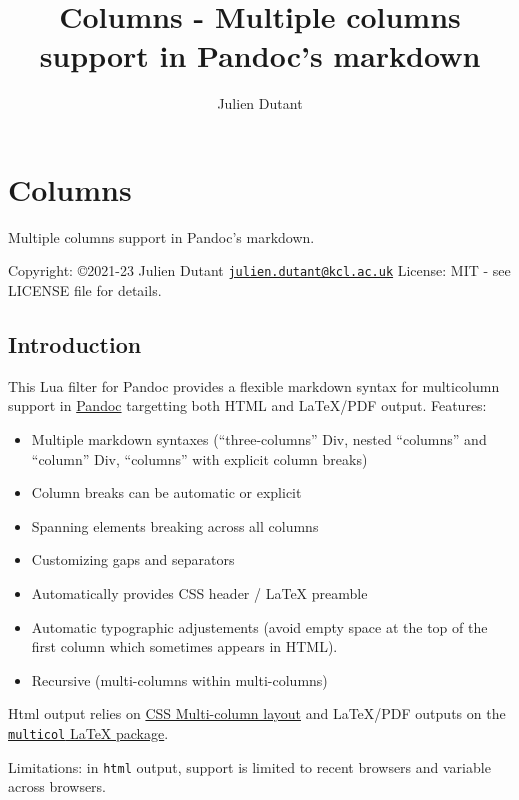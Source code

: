 \documentclass[
]{article}
\title{Columns - Multiple columns support in Pandoc's markdown}
\author{Julien Dutant}
\date{}
\providecommand{\tightlist}{%
  \setlength{\itemsep}{0pt}\setlength{\parskip}{0pt}}
\begin{document}
\maketitle

\hypertarget{columns}{%
\section{Columns}\label{columns}}

Multiple columns support in Pandoc's markdown.

Copyright: ©2021-23 Julien Dutant
\href{mailto:julien.dutant@kcl.ac.uk}{\nolinkurl{julien.dutant@kcl.ac.uk}}
License: MIT - see LICENSE file for details.

\hypertarget{introduction}{%
\subsection{Introduction}\label{introduction}}

This Lua filter for Pandoc provides a flexible markdown syntax for
multicolumn support in \href{https://pandoc.org/}{Pandoc} targetting
both HTML and LaTeX/PDF output. Features:

\begin{itemize}
\tightlist
\item
  Multiple markdown syntaxes (``three-columns'' Div, nested ``columns''
  and ``column'' Div, ``columns'' with explicit column breaks)
\item
  Column breaks can be automatic or explicit
\item
  Spanning elements breaking across all columns
\item
  Customizing gaps and separators
\item
  Automatically provides CSS header / LaTeX preamble
\item
  Automatic typographic adjustements (avoid empty space at the top of
  the first column which sometimes appears in HTML).
\item
  Recursive (multi-columns within multi-columns)
\end{itemize}

Html output relies on \href{https://drafts.csswg.org/css-multicol}{CSS
Multi-column layout} and LaTeX/PDF outputs on the
\href{https://www.ctan.org/pkg/multicol}{\texttt{multicol} LaTeX
package}.

Limitations: in \texttt{html} output, support is limited to recent
browsers and variable across browsers.
\end{document}
